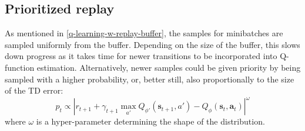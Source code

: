 \subsection{Prioritized replay}
As mentioned in \ref{q-learning-w-replay-buffer}, the samples for minibatches are sampled 
uniformly from the buffer. Depending on the size of the buffer, this slows down progress
as it takes time for newer transitions to be incorporated into Q-function estimation.
Alternatively, newer samples could be given priority by being sampled with
a higher probability, or, better still, also proportionally
to the size of the TD error:
\begin{equation}
	p_{ t } \propto \left| 
r_{ t+1 } + \gamma_{ t+1 } \max_{a'} Q_{ \phi' } (\bm{s}_{t+1}, a') -
Q_{ \phi } (\bm{s}_{t}, \bm{a}_{t} )
	\right|^{ \omega } 	
\end{equation}
where $ \omega  $ is a hyper-parameter determining the shape of the distribution.

%
%

